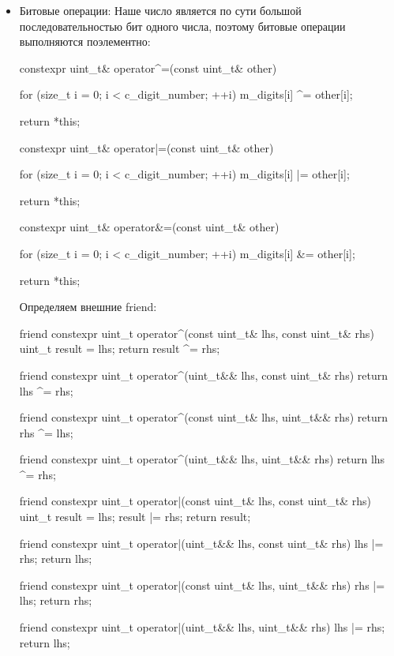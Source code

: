 \begin{itemize}
\begin{cppcode}
{    return std::strong_ordering::equal;
}
    \end{cppcode}
    Так как мы не определили через default, нам придётся написать и оператор равенства, но он очевиден:
    \begin{cppcode}
friend constexpr bool operator==(const uint_t& lhs, const uint_t& rhs) {
    return lhs.m_digits == rhs.m_digits;
}
    \end{cppcode}
  \item Битовые операции:
  Наше число является по сути большой последовательностью бит одного числа, поэтому битовые операции выполняются поэлементно:
  \begin{cppcode}
constexpr uint_t& operator^=(const uint_t& other) {
    for (size_t i = 0; i < c_digit_number; ++i) {
        m_digits[i] ^= other[i];
    }

    return *this;
}

constexpr uint_t& operator|=(const uint_t& other) {
    for (size_t i = 0; i < c_digit_number; ++i) {
        m_digits[i] |= other[i];
    }

    return *this;
}

constexpr uint_t& operator&=(const uint_t& other) {
    for (size_t i = 0; i < c_digit_number; ++i) {
        m_digits[i] &= other[i];
    }

    return *this;
}
  \end{cppcode}
  Определяем внешние friend:
  \begin{cppcode}
friend constexpr uint_t operator^(const uint_t& lhs, const uint_t& rhs) {
    uint_t result = lhs;
    return result ^= rhs;
}

friend constexpr uint_t operator^(uint_t&& lhs, const uint_t& rhs) {
    return lhs ^= rhs;
}

friend constexpr uint_t operator^(const uint_t& lhs, uint_t&& rhs) {
    return rhs ^= lhs;
}

friend constexpr uint_t operator^(uint_t&& lhs, uint_t&& rhs) {
    return lhs ^= rhs;
}

friend constexpr uint_t operator|(const uint_t& lhs, const uint_t& rhs) {
    uint_t result = lhs;
    result |= rhs;
    return result;
}

friend constexpr uint_t operator|(uint_t&& lhs, const uint_t& rhs) {
    lhs |= rhs;
    return lhs;
}

friend constexpr uint_t operator|(const uint_t& lhs, uint_t&& rhs) {
    rhs |= lhs;
    return rhs;
}

friend constexpr uint_t operator|(uint_t&& lhs, uint_t&& rhs) {
    lhs |= rhs;
    return lhs;
}


\end{cppcode}
\end{itemize}

